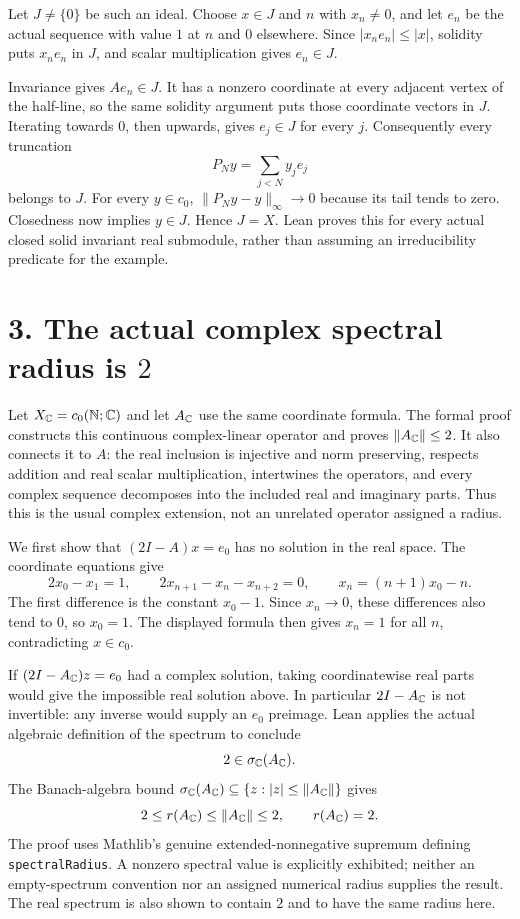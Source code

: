 \documentclass[10pt]{article}
\begin{document}
Let $J\ne\{0\}$ be such an ideal. Choose $x\in J$ and $n$ with $x_n\ne0$, and let $e_n$ be the actual sequence with value $1$ at $n$ and $0$ elsewhere. Since $|x_ne_n|\le|x|$, solidity puts $x_ne_n$ in $J$, and scalar multiplication gives $e_n\in J$.

Invariance gives $Ae_n\in J$. It has a nonzero coordinate at every adjacent vertex of the half-line, so the same solidity argument puts those coordinate vectors in $J$. Iterating towards $0$, then upwards, gives $e_j\in J$ for every $j$. Consequently every truncation
\[
P_Ny=\sum_{j<N}y_je_j
\]
belongs to $J$. For every $y\in c_0$, $\|P_Ny-y\|_\infty\to0$ because its tail tends to zero. Closedness now implies $y\in J$. Hence $J=X$. Lean proves this for every actual closed solid invariant real submodule, rather than assuming an irreducibility predicate for the example.

\newpage
\section*{3. The actual complex spectral radius is $2$}
Let $X_{\mathbb C}=c_0(\mathbb N;\mathbb C)$ and let $A_{\mathbb C}$ use the same coordinate formula. The formal proof constructs this continuous complex-linear operator and proves $\|A_{\mathbb C}\|\le2$. It also connects it to $A$: the real inclusion is injective and norm preserving, respects addition and real scalar multiplication, intertwines the operators, and every complex sequence decomposes into the included real and imaginary parts. Thus this is the usual complex extension, not an unrelated operator assigned a radius.

We first show that $(2I-A)x=e_0$ has no solution in the real space. The coordinate equations give
\[
2x_0-x_1=1,\qquad
2x_{n+1}-x_n-x_{n+2}=0,
\qquad
x_n=(n+1)x_0-n.
\]
The first difference is the constant $x_0-1$. Since $x_n\to0$, these differences also tend to $0$, so $x_0=1$. The displayed formula then gives $x_n=1$ for all $n$, contradicting $x\in c_0$.

If $(2I-A_{\mathbb C})z=e_0$ had a complex solution, taking coordinatewise real parts would give the impossible real solution above. In particular $2I-A_{\mathbb C}$ is not invertible: any inverse would supply an $e_0$ preimage. Lean applies the actual algebraic definition of the spectrum to conclude
\[
2\in\sigma_{\mathbb C}(A_{\mathbb C}).
\]
The Banach-algebra bound $\sigma_{\mathbb C}(A_{\mathbb C})\subseteq\{z:|z|\le\|A_{\mathbb C}\|\}$ gives
\[
2\le r(A_{\mathbb C})\le\|A_{\mathbb C}\|\le2,
\qquad r(A_{\mathbb C})=2.
\]
The proof uses Mathlib's genuine extended-nonnegative supremum defining \texttt{spectralRadius}. A nonzero spectral value is explicitly exhibited; neither an empty-spectrum convention nor an assigned numerical radius supplies the result. The real spectrum is also shown to contain $2$ and to have the same radius here.
\end{document}
